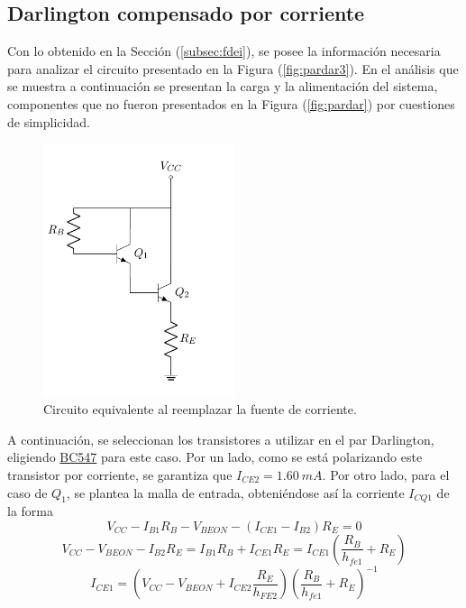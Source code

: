 \subsection{Darlington compensado por corriente}
Con lo obtenido en la Sección (\ref{subsec:fdei}), se posee la información necesaria para analizar el circuito presentado en la Figura (\ref{fig:pardar3}). En el análisis que se muestra a continuación se presentan la carga y la alimentación del sistema, componentes que no fueron presentados en la Figura (\ref{fig:pardar}) por cuestiones de simplicidad.
\begin{figure}[H]
\centering
	\includegraphics[width=0.5\textwidth, page=5]{Imagenes/ParDarlington.pdf}
	\caption{Circuito equivalente al reemplazar la fuente de corriente.}
	\label{fig:pardar4}
\end{figure}

A continuación, se seleccionan los transistores a utilizar en el par Darlington, eligiendo \href{https://www.sparkfun.com/datasheets/Components/BC546.pdf}{BC547} para este caso. Por un lado, como se está polarizando este transistor por corriente, se garantiza que $I_{CE2} = 1.60 \ mA$. Por otro lado, para el caso de $Q_1$, se plantea la malla de entrada, obteniéndose así la corriente $I_{CQ1}$ de la forma
\begin{equation*}
	V_{CC} - I_{B1} R_B - V_{BEON} - \left( I_{CE1} - I_{B2} \right) R_E = 0
\end{equation*}
\begin{equation*}
	V_{CC} - V_{BEON} - I_{B2} R_E = I_{B1} R_B + I_{CE1} R_E = I_{CE1} \left( \frac{R_B}{h_{fe1}} + R_E \right)
\end{equation*}
\begin{equation}
	I_{CE1} = \left( V_{CC} - V_{BEON} + I_{CE2} \frac{R_E}{h_{FE2}} \right) \left( \frac{R_B}{h_{fe1}} + R_E \right)^{-1}
\end{equation}


